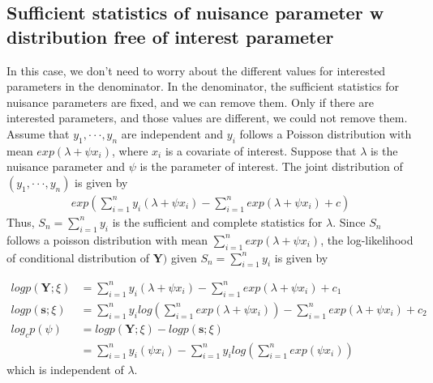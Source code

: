 \documentclass[11pt]{article} %
\begin{document}
\subsection{Sufficient statistics of nuisance parameter w distribution free of interest parameter}
In this case, we don't need to worry about the different values for interested parameters in the denominator. In the denominator, the sufficient statistics for nuisance parameters are fixed, and we can remove them. Only if there are interested parameters, and those values are different, we could not remove them.\\


Assume that $y_1, · · · , y_n$ are independent and $y_i$ follows a Poisson distribution with mean $exp(\lambda + \psi x_i)$, where $x_i$ is a covariate of interest. Suppose that $\lambda$ is the nuisance parameter and $\psi$ is the parameter of interest. The joint distribution of $(y_1, · · · , y_n)$ is given by 
\begin{align*}
    exp \left( \sum_{i=1}^n y_i(\lambda + \psi x_i) - \sum_{i=1}^n exp(\lambda + \psi x_i) +c \right)
 \end{align*}
Thus, $S_n = \sum_{i=1}^n y_i$ is the sufficient and complete statistics for $\lambda$. Since $S_n$ follows a poisson distribution with mean $\sum_{i=1}^n exp(\lambda + \psi x_i)$, the log-likelihood of conditional distribution of $\textbf{Y})$ given $S_n = \sum_{i=1}^n y_i$ is given by

\begin{align*}
    log p(\textbf{Y}; \xi) &= \sum_{i=1}^n y_i(\lambda + \psi x_i) - \sum_{i=1}^n exp(\lambda + \psi x_i) +c_1\\
    log p(\textbf{s}; \xi) &= \sum_{i=1}^n y_i log \left( \sum_{i=1}^n exp(\lambda + \psi x_i) \right) - \sum_{i=1}^n exp(\lambda + \psi x_i) +c_2\\
   log_c p(\psi) &= log p(\textbf{Y}; \xi) - log p(\textbf{s}; \xi) \\
   &=   \sum_{i=1}^n y_i(\psi x_i) - \sum_{i=1}^n y_i log \left( \sum_{i=1}^n exp(\psi x_i) \right)
 \end{align*}
 which is independent of $\lambda$. \\
 
\end{document}

